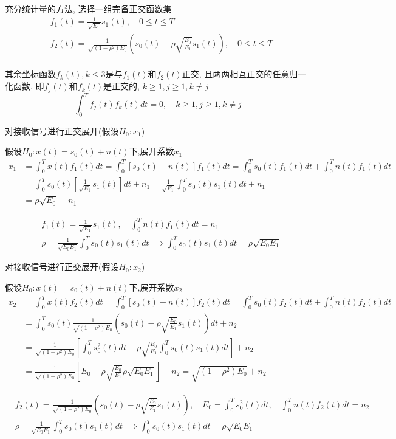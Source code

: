 \begin{frame}{充分统计量的方法, 选择一组完备正交函数集}
\begin{align*}
&f_1(t)=\frac{1}{\sqrt{E_1}}s_1(t),\quad 0\le t\le T\\
&f_2(t)=\frac{1}{\sqrt{(1-\rho^2)E_0}}\left(s_0(t)-\rho\sqrt{\frac{E_0}{E_1}}s_1(t)\right),\quad 0\le t\le T
\end{align*}
~\\
\vspace{0.2cm}
其余坐标函数$f_k(t), k\le 3$是与$f_1(t)$和$f_2(t)$正交, 且两两相互正交的任意归一化函数, 即$f_j(t)$和$f_k(t)$是正交的, $k\ge 1, j\ge 1, k\ne j$
\[\int_{0}^{T}f_j(t)f_k(t)dt=0,\quad k\ge 1, j\ge 1, k\ne j\]
\end{frame}

\begin{frame}[shrink]{对接收信号进行正交展开(假设$H_0: x_1$)}
\begin{block}{假设$H_0:x(t)=s_0(t)+n(t)$下,展开系数$x_1$}
\begin{align*}
x_1&=\int_{0}^{T}x(t)f_1(t)dt=\int_{0}^{T}[s_0(t)+n(t)]f_1(t)dt=\int_{0}^{T}s_0(t)f_1(t)dt+\int_{0}^{T}n(t)f_1(t)dt\\
&=\int_{0}^{T}s_0(t)[\frac{1}{\sqrt{E_1}}s_1(t)]dt+n_1=\frac{1}{\sqrt{E_1}}\int_{0}^{T}s_0(t)s_1(t)dt+n_1\\
&=\rho\sqrt{E_0}+n_1
\end{align*}
\end{block}
\begin{align*}
&f_1(t)=\frac{1}{\sqrt{E_1}}s_1(t),\quad \int_{0}^{T}n(t)f_1(t)dt=n_1\\
&\rho=\frac{1}{\sqrt{E_0E_1}}\int_{0}^{T}s_0(t)s_1(t)dt\implies \int_{0}^{T}s_0(t)s_1(t)dt=\rho\sqrt{E_0E_1}
\end{align*}
\end{frame}

\begin{frame}[shrink]{对接收信号进行正交展开(假设$H_0:x_2$)}
\begin{block}{假设$H_0:x(t)=s_0(t)+n(t)$下,展开系数$x_2$}
	\begin{align*}
	x_2&=\int_{0}^{T}x(t)f_2(t)dt=\int_{0}^{T}[s_0(t)+n(t)]f_2(t)dt=\int_{0}^{T}s_0(t)f_2(t)dt+\int_{0}^{T}n(t)f_2(t)dt\\
	&=\int_{0}^{T}s_0(t)\frac{1}{\sqrt{(1-\rho^2)E_0}}\left(s_0(t)-\rho\sqrt{\frac{E_0}{E_1}}s_1(t)\right)dt+n_2\\
	&=\frac{1}{\sqrt{(1-\rho^2)E_0}}\left[\int_{0}^{T}s_0^2(t)dt-\rho\sqrt{\frac{E_0}{E_1}}\int_{0}^{T}s_0(t)s_1(t)dt\right]+n_2\\
	&=\frac{1}{\sqrt{(1-\rho^2)E_0}}\left[E_0-\rho\sqrt{\frac{E_0}{E_1}}\rho\sqrt{E_0E_1}\right]+n_2=\sqrt{(1-\rho^2)E_0}+n_2
	\end{align*}
\end{block}
\begin{align*}
&f_2(t)=\frac{1}{\sqrt{(1-\rho^2)E_0}}\left(s_0(t)-\rho\sqrt{\frac{E_0}{E_1}}s_1(t)\right),\quad E_0=\int_{0}^{T}s_0^2(t)dt,\quad \int_{0}^{T}n(t)f_2(t)dt=n_2\\
&\rho=\frac{1}{\sqrt{E_0E_1}}\int_{0}^{T}s_0(t)s_1(t)dt\implies \int_{0}^{T}s_0(t)s_1(t)dt=\rho\sqrt{E_0E_1}
\end{align*}
\end{frame}

